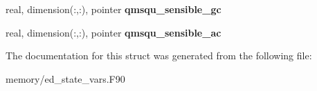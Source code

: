 \begin{DoxyCompactItemize}
\item 
\hypertarget{structed__state__vars_1_1sitetype_a9f0ca2579bc7075b84b5bfeda0d69312}{
real, dimension(:,:), pointer {\bfseries qmsqu\_\-sensible\_\-gc}}
\label{structed__state__vars_1_1sitetype_a9f0ca2579bc7075b84b5bfeda0d69312}

\item 
\hypertarget{structed__state__vars_1_1sitetype_abd771e4b082c0bd1cb79e4f30a09b80f}{
real, dimension(:,:), pointer {\bfseries qmsqu\_\-sensible\_\-ac}}
\label{structed__state__vars_1_1sitetype_abd771e4b082c0bd1cb79e4f30a09b80f}

\end{DoxyCompactItemize}


The documentation for this struct was generated from the following file:\begin{DoxyCompactItemize}
\item 
memory/ed\_\-state\_\-vars.F90\end{DoxyCompactItemize}
